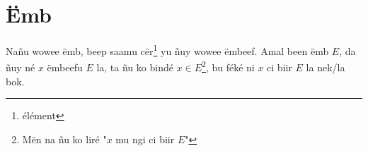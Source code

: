 \documentclass[twoside, a4paper]{article}
\begin{document}
 



\section{Ëmb}
\begin{tcolorbox}[enhanced jigsaw,breakable,pad at break*=1mm,
    colback=red!5!white,colframe=white!75!black,title= Téeki,
    watermark color=white]
  Nañu wowee ëmb, beep saamu cër\footnote{élément} yu ñuy wowee ëmbeef. Amal been ëmb $E$, da ñuy né $x$ ëmbeefu $E$ la, ta ñu ko bindé $x\in E$\footnote{Mën na ñu ko liré "$x$ mu ngi ci biir $E$"}, bu féké ni $x$ ci biir $E$ la nek/la bok.
\end{tcolorbox}
\end{document}
